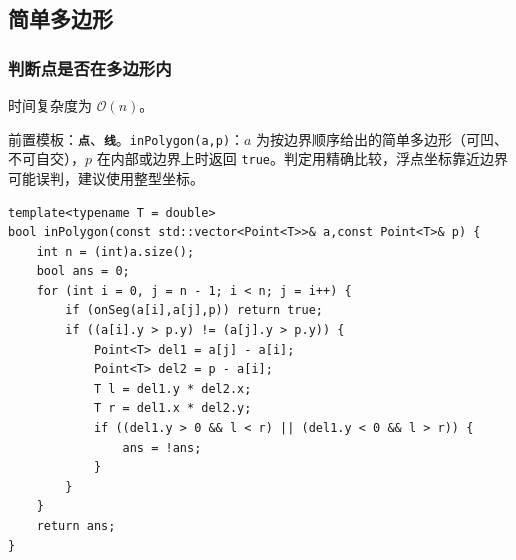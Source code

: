 \subsection{简单多边形}

\subsubsection{判断点是否在多边形内}

时间复杂度为 $\mathcal{O}(n)$。

前置模板：\textbf{\texttt{点}}、\textbf{\texttt{线}}。\verb|inPolygon(a,p)|：$a$ 为按边界顺序给出的简单多边形（可凹、不可自交），$p$ 在内部或边界上时返回 \texttt{true}。判定用精确比较，浮点坐标靠近边界可能误判，建议使用整型坐标。

\begin{lstlisting}
template<typename T = double>
bool inPolygon(const std::vector<Point<T>>& a,const Point<T>& p) {
    int n = (int)a.size();
    bool ans = 0;
    for (int i = 0, j = n - 1; i < n; j = i++) {
        if (onSeg(a[i],a[j],p)) return true;
        if ((a[i].y > p.y) != (a[j].y > p.y)) {
            Point<T> del1 = a[j] - a[i];
            Point<T> del2 = p - a[i];
            T l = del1.y * del2.x;
            T r = del1.x * del2.y;
            if ((del1.y > 0 && l < r) || (del1.y < 0 && l > r)) {
                ans = !ans;
            }
        }
    }
    return ans;
}
\end{lstlisting}